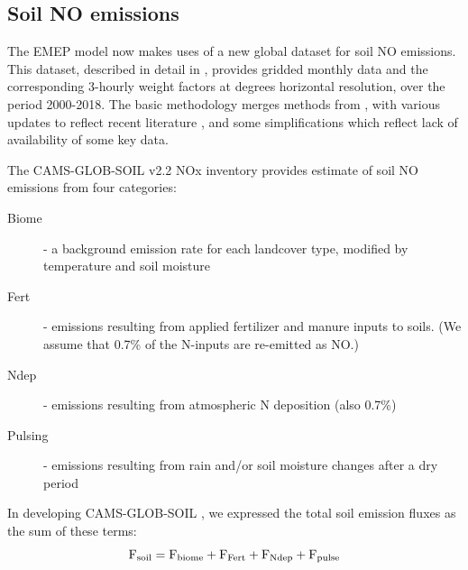 \clearpage


\subsection{Soil NO emissions}
\label{ssec:soilNO}

The EMEP model now makes uses of a new global dataset for soil NO
emissions. This dataset, described in detail in \citet{SimpsonDarras:2021},
provides gridded monthly data and the corresponding 3-hourly
weight factors at  degrees horizontal resolution, over
the period 2000-2018.  The basic methodology merges methods from
\citet{YiengerLevy:1995}, with various updates to reflect recent
literature \citep[especially][]{SteinkampLawrence2011}, and some
simplifications which reflect lack of  availability of some key data.



The CAMS-GLOB-SOIL v2.2 NOx inventory
provides estimate of soil NO emissions from four categories:

\begin{description}
  \item[Biome] - a background emission rate for each landcover type, modified by temperature
and soil moisture %
  \item[Fert] - emissions resulting from applied fertilizer and manure inputs to soils. (We assume
that  0.7\% of the N-inputs are re-emitted as NO.)
  \item[Ndep] - emissions resulting from atmospheric N deposition (also 0.7\%)
  \item[Pulsing] - emissions resulting from rain and/or soil moisture changes after
    a dry period
\end{description}

In developing CAMS-GLOB-SOIL , we  expressed the total soil emission fluxes as the sum
of these terms:
\begin{equation}
  \mbox{F}_{\scriptsize \mbox{soil}} = \mbox{F}_{\scriptsize \mbox{biome}}  + \mbox{F}_{\scriptsize \mbox{Fert}} + \mbox{F}_{\scriptsize \mbox{Ndep}} + \mbox{F}_{\scriptsize \mbox{pulse}}
  \label{eqn:Fs}
\end{equation}

